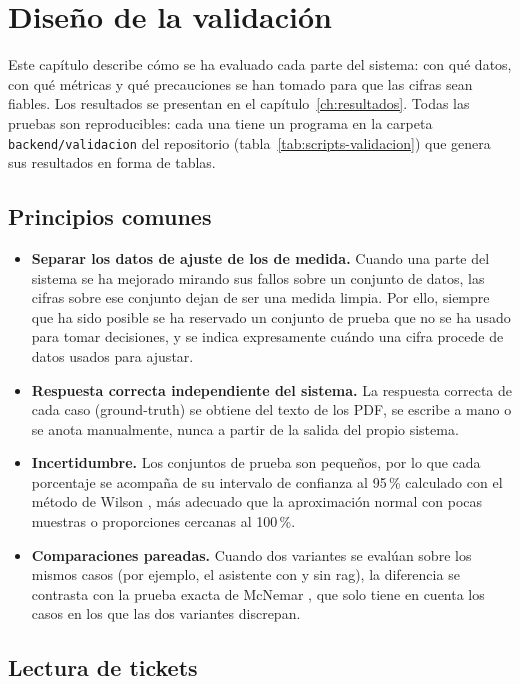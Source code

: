 \chapter{Diseño de la validación}
\label{ch:validacion}

Este capítulo describe cómo se ha evaluado cada parte del sistema: con qué datos, con qué métricas y qué precauciones se han tomado para que las cifras sean fiables. Los resultados se presentan en el capítulo~\ref{ch:resultados}. Todas las pruebas son reproducibles: cada una tiene un programa en la carpeta \texttt{backend/validacion} del repositorio (tabla~\ref{tab:scripts-validacion}) que genera sus resultados en forma de tablas.

\section{Principios comunes}
\label{s:principios-validacion}

\begin{itemize}
    \item \textbf{Separar los datos de ajuste de los de medida.} Cuando una parte del sistema se ha mejorado mirando sus fallos sobre un conjunto de datos, las cifras sobre ese conjunto dejan de ser una medida limpia. Por ello, siempre que ha sido posible se ha reservado un conjunto de prueba que no se ha usado para tomar decisiones, y se indica expresamente cuándo una cifra procede de datos usados para ajustar.
    \item \textbf{Respuesta correcta independiente del sistema.} La respuesta correcta de cada caso (\gls{ground-truth}) se obtiene del texto de los PDF, se escribe a mano o se anota manualmente, nunca a partir de la salida del propio sistema.
    \item \textbf{Incertidumbre.} Los conjuntos de prueba son pequeños, por lo que cada porcentaje se acompaña de su intervalo de confianza al 95\,\% calculado con el método de Wilson \parencite{wilson1927probable}, más adecuado que la aproximación normal con pocas muestras o proporciones cercanas al 100\,\%.
    \item \textbf{Comparaciones pareadas.} Cuando dos variantes se evalúan sobre los mismos casos (por ejemplo, el asistente con y sin \gls{rag}), la diferencia se contrasta con la prueba exacta de McNemar \parencite{mcnemar1947note}, que solo tiene en cuenta los casos en los que las dos variantes discrepan.
\end{itemize}

\section{Lectura de tickets}
\label{s:val-donut}

